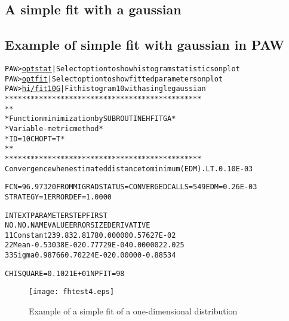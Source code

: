 \subsection{A simple fit with a gaussian}

\subsection*{Example of simple fit with gaussian in PAW}
\begin{alltt}
PAW > \underline{opt stat}    | Select option to show histogram statistics on plot
PAW > \underline{opt fit}     | Select option to show fitted parameters on plot
PAW > \underline{hi/fit 10 G} | Fit histogram 10 with a single gaussian
    **********************************************
    *                                            *
    * Function minimization by SUBROUTINE HFITGA *
    * Variable-metric method                     *
    * ID =         10  CHOPT = T                 *
    *                                            *
    **********************************************
Convergence when estimated distance to minimum (EDM) .LT.  0.10E-03
 
FCN=   96.97320     FROM MIGRAD    STATUS=CONVERGED  CALLS=  549 EDM=  0.26E-03
                    STRATEGY= 1    ERROR DEF=    1.0000
 
INT EXT  PARAMETER                                   STEP         FIRST
NO. NO.    NAME        VALUE          ERROR          SIZE      DERIVATIVE
  1  1  Constant      239.83        2.8178       0.00000       0.57627E-02
  2  2  Mean        -0.53038E-02   0.77729E-04   0.00000        22.025
  3  3  Sigma        0.98766       0.70224E-02   0.00000      -0.88534
 
CHISQUARE = 0.1021E+01  NPFIT =   98
\end{alltt}

\begin{figure}
\centering\texttt{[image: fhtest4.eps]}
\caption{Example of a simple fit of a one-dimensional distribution}
\label{fig:FHTEST4}
\end{figure}

